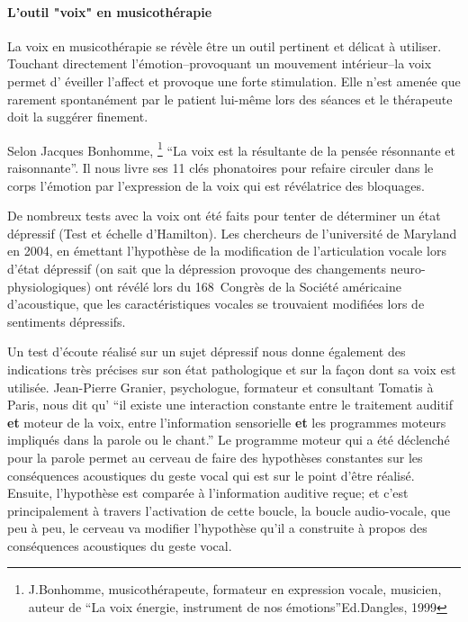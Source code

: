 \paragraph{L'outil "voix" en musicothérapie}

La voix en musicothérapie se révèle être un outil pertinent et délicat
à utiliser. Touchant 
directement 
l'émotion--provoquant un mouvement intérieur--la voix permet d'
éveiller l'affect
et provoque une forte stimulation. Elle n'est amenée que rarement
spontanément par le patient lui-même lors des séances et le thérapeute doit la suggérer
finement.

Selon Jacques Bonhomme, \footnote{J.Bonhomme, musicothérapeute, formateur 
  	en expression vocale, musicien, auteur de ``La voix énergie,
        instrument de nos émotions''Ed.Dangles, 1999} ``La voix est la
      résultante de la pensée résonnante et raisonnante''.
      Il nous livre ses 11 clés phonatoires pour refaire circuler dans
      le corps 
      l'émotion par l'expression de la voix qui est révélatrice des bloquages.

De nombreux tests avec 
la voix
 ont été faits pour tenter de déterminer un état dépressif 
(Test et échelle d'Hamilton). Les chercheurs de l'université de Maryland en 
2004,
en émettant l'hypothèse de la modification de l'articulation vocale 
lors d'état dépressif (on sait que la dépression provoque des changements  
neuro-physiologiques) ont révélé lors du 168\ieme\ Congrès de la Société
américaine d'acoustique, que les caractéristiques 
vocales se trouvaient modifiées lors de sentiments 
dépressifs\autocite{le_service_metronews}.



Un test d'écoute réalisé sur un sujet dépressif nous donne également des indications
très précises sur son état
pathologique et sur la façon dont sa voix est utilisée. Jean-Pierre
Granier, psychologue, formateur et consultant Tomatis à Paris, nous dit qu' 
``il existe une 
interaction
constante entre le traitement auditif \textbf{et} moteur de la
voix, entre l'information sensorielle \textbf{et} les programmes moteurs impliqués
dans la parole ou le chant.'' Le programme moteur qui a été déclenché
pour la parole permet au cerveau de faire des hypothèses constantes
sur les conséquences acoustiques du geste vocal qui est sur le point
d'être réalisé. Ensuite, l'hypothèse est comparée à l'information
auditive reçue; et c'est principalement à travers l'activation de cette boucle, la
boucle audio-vocale, que peu à peu, le cerveau va modifier l'hypothèse
qu'il a construite à propos des conséquences acoustiques du geste vocal.





